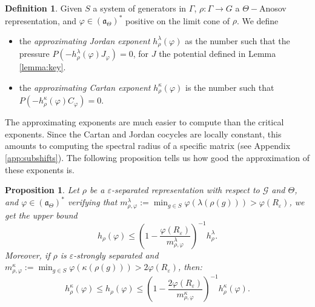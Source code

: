 \documentclass{amsart}
\newtheorem{prop}[thm]{Proposition}
\theoremstyle{remark}
\theoremstyle{definition}
\newtheorem{defi}[thm]{Definition}
\begin{document}
\begin{defi}
 Given $S$ a system of generators in $\Gamma$, $\rho : \Gamma \rightarrow G$ a $\Theta-$Anosov representation, and $\varphi \in (\mathfrak{a}_\Theta)^*$ positive on the limit cone of $\rho$.
 We define 
   \begin{itemize}
    \item the \emph{approximating Jordan exponent} $h^\lambda_\rho (\varphi)$ as the number such that the pressure $P(- h^\lambda_\rho (\varphi) J_\varphi) = 0$, for $J$ the potential defined in Lemma \ref{lemma:key}.
    \item the \emph{approximating Cartan exponent} $h^\kappa_\rho (\varphi)$ is the number such that \newline $P(- h^\kappa_\rho (\varphi) C_\varphi) = 0$.
   \end{itemize}
\end{defi}

The approximating exponents are much easier to compute than the critical exponents. Since the Cartan and Jordan cocycles are locally constant, this amounts to computing the spectral radius of a specific matrix (see Appendix \ref{app:subshifts}). The following proposition tells us how good the approximation of these exponents is.

\begin{prop}
\label{prop:criticalexponents}
 Let $\rho$ be a $\varepsilon$-separated representation with respect to $\mathcal{G}$ and $\Theta$, and $\varphi \in (\mathfrak{a}_\Theta)^*$ verifying that $m^\lambda_{\rho,\varphi} := \min_{g \in S} \varphi (\lambda (\rho (g))) > \varphi (R_{\varepsilon})$, we get the upper bound
   $$h_\rho (\varphi) \leq \left( 1 - \frac{\varphi (R_{\varepsilon})}{m^\lambda_{\rho,\varphi}} \right)^{-1} h_\rho^\lambda.$$
 Moreover, if $\rho$ is $\varepsilon$-strongly separated and $m^\kappa_{\rho,\varphi} := \min_{g \in S} \varphi (\kappa (\rho (g))) > 2 \varphi (R_{\varepsilon})$, then:
   $$h_\rho^\kappa (\varphi) \leq h_\rho (\varphi) \leq \left( 1 - \frac{2\varphi (R_{\varepsilon})}{m^\kappa_{\rho,\varphi}} \right)^{-1} h^\kappa_\rho (\varphi).$$
\end{prop}
\end{document}
